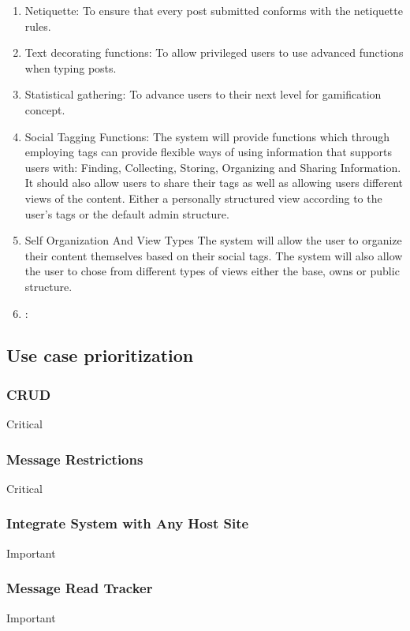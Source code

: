 \documentclass[12pt, oneside]{article}
\begin{document}
\begin{enumerate}
\\
\item{Netiquette}: To ensure that every post submitted conforms with the netiquette rules.
\\
\item{Text decorating functions}: To allow privileged users to use advanced functions when typing posts.
\\
\item{Statistical gathering}: To advance users to their next level for gamification concept.
\\
\item{Social Tagging Functions}: The system will provide functions which through employing tags can provide flexible ways of using information that supports users with: Finding, Collecting, Storing, Organizing and Sharing Information. It should also allow users to share their tags as well as allowing users different views of the content. Either a personally structured view according to the user's tags or the default admin structure.
\\
\item{Self Organization And View Types} The system will allow the user to organize their content themselves based on their social tags. The system will also allow the user to chose from different types of views either the base, owns or public structure.
\item{}:
 
\end{enumerate}

\subsection{Use case prioritization}
\subsubsection{CRUD}
Critical
\subsubsection{Message Restrictions}
Critical
\subsubsection{Integrate System with Any Host Site}
Important
\subsubsection{Message Read Tracker}
Important
\end{document}
